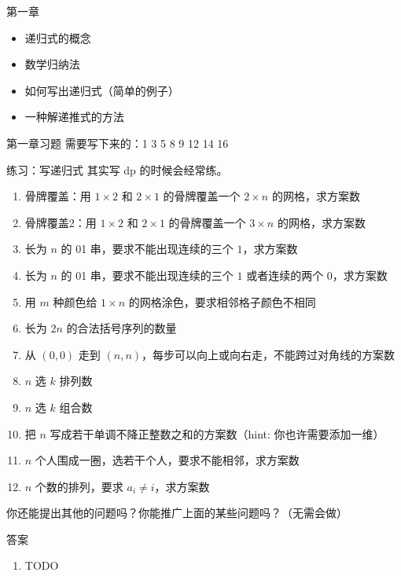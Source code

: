 \begin{frame}{第一章}
\begin{itemize}
    \item 递归式的概念
    \item 数学归纳法
    \item 如何写出递归式（简单的例子）
    \item 一种解递推式的方法
\end{itemize}
\end{frame}
\begin{frame}{第一章习题}
    需要写下来的：1 3 5 8 9 12 14 16
\end{frame}
\begin{frame}{练习：写递归式}
    其实写 dp 的时候会经常练。
    \begin{enumerate}[1]
        \item 骨牌覆盖：用 $1\times 2$ 和 $2\times 1$ 的骨牌覆盖一个 $2\times n$ 的网格，求方案数
        \item 骨牌覆盖2：用 $1\times 2$ 和 $2\times 1$ 的骨牌覆盖一个 $3\times n$ 的网格，求方案数
        \item 长为 $n$ 的 01 串，要求不能出现连续的三个 $1$，求方案数
        \item 长为 $n$ 的 01 串，要求不能出现连续的三个 $1$ 或者连续的两个 $0$，求方案数
        \item 用 $m$ 种颜色给 $1\times n$ 的网格涂色，要求相邻格子颜色不相同
        \item 长为 $2n$ 的合法括号序列的数量
        \item 从 $(0,0)$ 走到 $(n,n)$，每步可以向上或向右走，不能跨过对角线的方案数
        \item $n$ 选 $k$ 排列数
        \item $n$ 选 $k$ 组合数
        \item 把 $n$ 写成若干单调不降正整数之和的方案数（hint: 你也许需要添加一维）
        \item $n$ 个人围成一圈，选若干个人，要求不能相邻，求方案数
        \item $n$ 个数的排列，要求 $a_i\ne i$，求方案数
    \end{enumerate}
    你还能提出其他的问题吗？你能推广上面的某些问题吗？（无需会做）
\end{frame}
\begin{frame}{答案}
    \begin{enumerate}[1]
        \item TODO
    \end{enumerate}
\end{frame}
